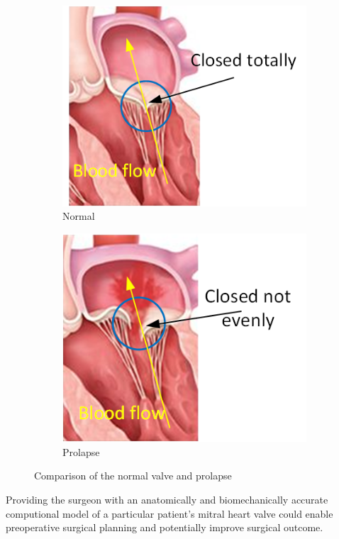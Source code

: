 \begin{figure}[H]\label{fig:compareMT}
  \centering
  \begin{subfigure}[H]{0.42\columnwidth}\label{fig:normalMT}
    \includegraphics[width=\columnwidth]{./fig/normalMT.png}
    \caption{Normal}
  \end{subfigure}
  \begin{subfigure}[H]{0.4\columnwidth}\label{fig:prolapseMT}
    \includegraphics[width=\columnwidth]{./fig/prolapseMT.png}
    \caption{Prolapse}
  \end{subfigure}
  \caption{Comparison of the normal valve and prolapse}
\end{figure}
Providing the surgeon with an anatomically and biomechanically accurate
computional model of a particular patient's mitral heart valve could enable
preoperative surgical planning and potentially improve surgical outcome.\par

